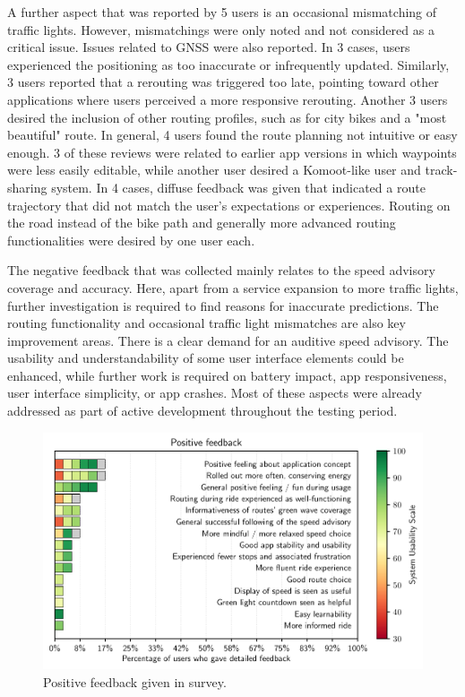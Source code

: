 A further aspect that was reported by 5 users is an occasional mismatching of traffic lights. However, mismatchings were only noted and not considered as a critical issue. Issues related to GNSS were also reported. In 3 cases, users experienced the positioning as too inaccurate or infrequently updated. Similarly, 3 users reported that a rerouting was triggered too late, pointing toward other applications where users perceived a more responsive rerouting. Another 3 users desired the inclusion of other routing profiles, such as for city bikes and a "most beautiful" route. In general, 4 users found the route planning not intuitive or easy enough. 3 of these reviews were related to earlier app versions in which waypoints were less easily editable, while another user desired a Komoot-like user and track-sharing system. In 4 cases, diffuse feedback was given that indicated a route trajectory that did not match the user's expectations or experiences. Routing on the road instead of the bike path and generally more advanced routing functionalities were desired by one user each.

The negative feedback that was collected mainly relates to the speed advisory coverage and accuracy. Here, apart from a service expansion to more traffic lights, further investigation is required to find reasons for inaccurate predictions. The routing functionality and occasional traffic light mismatches are also key improvement areas. There is a clear demand for an auditive speed advisory. The usability and understandability of some user interface elements could be enhanced, while further work is required on battery impact, app responsiveness, user interface simplicity, or app crashes. Most of these aspects were already addressed as part of active development throughout the testing period.

\begin{figure}[t]
\caption{Positive feedback given in survey.}\label{fig:app-positive-feedback}
\includegraphics[width=\linewidth]{images/app-feedback-positive.pdf}
\end{figure}

